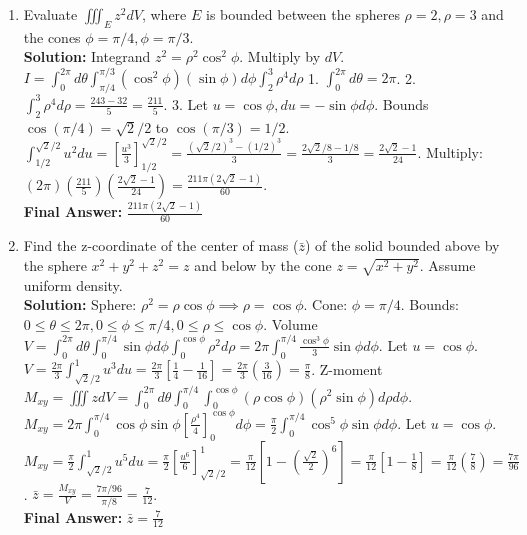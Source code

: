 \documentclass[11pt]{article}
\begin{document}
\begin{enumerate}[label=\textbf{\arabic*.}]
\item Evaluate $\iiint_E z^2 dV$, where $E$ is bounded between the spheres $\rho=2, \rho=3$ and the cones $\phi=\pi/4, \phi=\pi/3$.\\
\textbf{Solution:}
Integrand $z^2 = \rho^2\cos^2\phi$. Multiply by $dV$.
$I = \int_0^{2\pi} d\theta \int_{\pi/4}^{\pi/3} (\cos^2\phi)(\sin\phi) d\phi \int_2^3 \rho^4 d\rho$
1. $\int_0^{2\pi} d\theta = 2\pi$.
2. $\int_2^3 \rho^4 d\rho = \frac{243 - 32}{5} = \frac{211}{5}$.
3. Let $u=\cos\phi, du=-\sin\phi d\phi$. Bounds $\cos(\pi/4)=\sqrt{2}/2$ to $\cos(\pi/3)=1/2$. 
$\int_{1/2}^{\sqrt{2}/2} u^2 du = [\frac{u^3}{3}]_{1/2}^{\sqrt{2}/2} = \frac{(\sqrt{2}/2)^3 - (1/2)^3}{3} = \frac{2\sqrt{2}/8 - 1/8}{3} = \frac{2\sqrt{2}-1}{24}$.
Multiply: $(2\pi)(\frac{211}{5})(\frac{2\sqrt{2}-1}{24}) = \frac{211\pi(2\sqrt{2}-1)}{60}$.\\
\textbf{Final Answer:} $\frac{211\pi(2\sqrt{2}-1)}{60}$

\item Find the z-coordinate of the center of mass ($\bar{z}$) of the solid bounded above by the sphere $x^2+y^2+z^2=z$ and below by the cone $z=\sqrt{x^2+y^2}$. Assume uniform density.\\
\textbf{Solution:}
Sphere: $\rho^2 = \rho\cos\phi \implies \rho=\cos\phi$. Cone: $\phi=\pi/4$.
Bounds: $0 \le \theta \le 2\pi, 0 \le \phi \le \pi/4, 0 \le \rho \le \cos\phi$.
Volume $V = \int_0^{2\pi} d\theta \int_0^{\pi/4} \sin\phi d\phi \int_0^{\cos\phi} \rho^2 d\rho = 2\pi \int_0^{\pi/4} \frac{\cos^3\phi}{3}\sin\phi d\phi$.
Let $u=\cos\phi$. $V = \frac{2\pi}{3} \int_{\sqrt{2}/2}^1 u^3 du = \frac{2\pi}{3} [\frac{1}{4} - \frac{1}{16}] = \frac{2\pi}{3} (\frac{3}{16}) = \frac{\pi}{8}$.
Z-moment $M_{xy} = \iiint z dV = \int_0^{2\pi} d\theta \int_0^{\pi/4} \int_0^{\cos\phi} (\rho\cos\phi)(\rho^2\sin\phi) d\rho d\phi$.
$M_{xy} = 2\pi \int_0^{\pi/4} \cos\phi\sin\phi [\frac{\rho^4}{4}]_0^{\cos\phi} d\phi = \frac{\pi}{2} \int_0^{\pi/4} \cos^5\phi\sin\phi d\phi$.
Let $u=\cos\phi$. $M_{xy} = \frac{\pi}{2} \int_{\sqrt{2}/2}^1 u^5 du = \frac{\pi}{2} [\frac{u^6}{6}]_{\sqrt{2}/2}^1 = \frac{\pi}{12} [1 - (\frac{\sqrt{2}}{2})^6] = \frac{\pi}{12} [1 - \frac{1}{8}] = \frac{\pi}{12} (\frac{7}{8}) = \frac{7\pi}{96}$.
$\bar{z} = \frac{M_{xy}}{V} = \frac{7\pi/96}{\pi/8} = \frac{7}{12}$.\\
\textbf{Final Answer:} $\bar{z} = \frac{7}{12}$


\end{enumerate}
\end{document}
